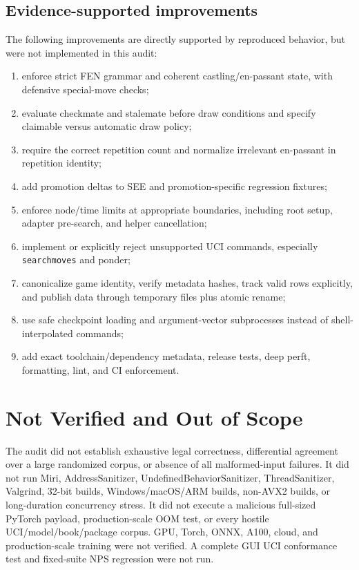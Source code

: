 \documentclass[conference]{IEEEtran}
\newcommand{\code}[1]{\texttt{\small #1}}
\begin{document}
\subsection{Evidence-supported improvements}
The following improvements are directly supported by reproduced behavior, but were not implemented in this audit:
\begin{enumerate}[leftmargin=*]
\item enforce strict FEN grammar and coherent castling/en-passant state, with defensive special-move checks;
\item evaluate checkmate and stalemate before draw conditions and specify claimable versus automatic draw policy;
\item require the correct repetition count and normalize irrelevant en-passant in repetition identity;
\item add promotion deltas to SEE and promotion-specific regression fixtures;
\item enforce node/time limits at appropriate boundaries, including root setup, adapter pre-search, and helper cancellation;
\item implement or explicitly reject unsupported UCI commands, especially \code{searchmoves} and ponder;
\item canonicalize game identity, verify metadata hashes, track valid rows explicitly, and publish data through temporary files plus atomic rename;
\item use safe checkpoint loading and argument-vector subprocesses instead of shell-interpolated commands;
\item add exact toolchain/dependency metadata, release tests, deep perft, formatting, lint, and CI enforcement.
\end{enumerate}

\section{Not Verified and Out of Scope}
The audit did not establish exhaustive legal correctness, differential agreement over a large randomized corpus, or absence of all malformed-input failures. It did not run Miri, AddressSanitizer, UndefinedBehaviorSanitizer, ThreadSanitizer, Valgrind, 32-bit builds, Windows/macOS/ARM builds, non-AVX2 builds, or long-duration concurrency stress. It did not execute a malicious full-sized PyTorch payload, production-scale OOM test, or every hostile UCI/model/book/package corpus. GPU, Torch, ONNX, A100, cloud, and production-scale training were not verified. A complete GUI UCI conformance test and fixed-suite NPS regression were not run.
\end{document}
